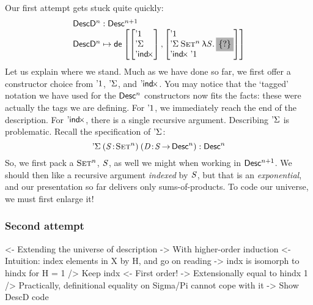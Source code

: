 Our first attempt gets stuck quite quickly:
%
\[\stk{
\DescD^n : \Desc^{n+1} \\
\DescD^n \mapsto
  \tada{\stkm{\DUnit\\ \SYMBDSigma\\ \SYMBDIndx}}
       {\stkm{ \DUnit                                \\
         \DSigma{\Set^n}{\LAM{\V{S}} \SHED}      \\
         \DIndx{\DUnit}    }                    } \\
}\]
%
Let us explain where we stand. Much as
we have done so far, we first offer a constructor choice from
$\DUnit$, $\SYMBDSigma$, and $\SYMBDIndx$. You may notice
that the `tagged' notation we have used for the $\Desc^n$ constructors now
fits the facts: these were actually the tags we are defining.
For $\DUnit$, we immediately reach the end of the description. For
$\SYMBDIndx$, there is a single recursive argument. Describing
$\SYMBDSigma$ is problematic. Recall the specification of
$\SYMBDSigma$:
%
\[
\DSigma{(\Bhab{\V{S}}{\Set^n})}{(\Bhab{\V{D}}{\V{S} \To \Desc^n})} : \Desc^n\\
\]
%
So, we first pack a  $\Set^n$, $\V{S}$, as well we might when working in
$\Desc^{n+1}$. We should then like
a recursive argument \emph{indexed} by $\V{S}$, but
that is an \emph{exponential}, and our presentation so far delivers only
sums-of-products. To code our universe, we must first enlarge it!


\subsubsection{Second attempt}

\begin{wstructure}
<- Extending the universe of description
    -> With higher-order induction
    <- Intuition: index elements in X by H, and go on reading
        -> indx is isomorph to hindx for H = 1
    /> Keep indx
        <- First order!
        -> Extensionally equal to hindx 1
        /> Practically, definitional equality on Sigma/Pi cannot cope with it
    -> Show DescD code
\end{wstructure}

